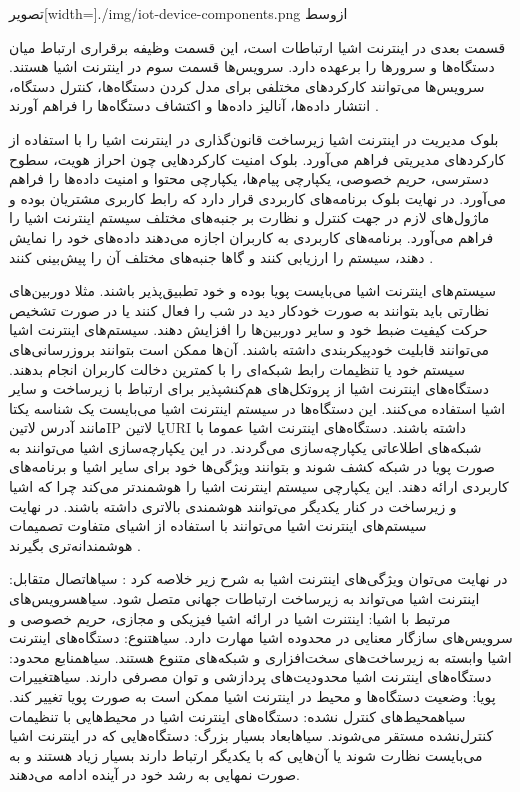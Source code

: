 ‌تصویر[width=\textwidth]{./img/iot-device-components.png}
‌ازوسط

قسمت بعدی در اینترنت اشیا ارتباطات است، این قسمت وظیفه برقراری ارتباط میان دستگاه‌ها و سرورها را برعهده دارد.
سرویس‌ها قسمت سوم در اینترنت اشیا هستند. سرویس‌ها می‌توانند کارکردهای مختلفی برای مدل کردن دستگاه‌ها، کنترل دستگاه،
انتشار داده‌ها، آنالیز داده‌ها و اکتشاف دستگاه‌ها را فراهم آورند
.

بلوک مدیریت در اینترنت اشیا زیرساخت قانون‌گذاری در اینترنت اشیا را با استفاده از کارکردهای مدیریتی فراهم می‌آورد.
بلوک امنیت کارکردهایی چون احراز هویت، سطوح دسترسی، حریم خصوصی، یکپارچی پیام‌ها، یکپارچی محتوا و امنیت داده‌ها را فراهم می‌آورد.
در نهایت بلوک برنامه‌های کاربردی قرار دارد که رابط کاربری مشتریان بوده و ماژول‌های لازم در جهت کنترل و نظارت بر جنبه‌های مختلف سیستم اینترنت اشیا
را فراهم می‌آورد. برنامه‌های کاربردی به کاربران اجازه می‌دهند داده‌های خود را نمایش دهند، سیستم را ارزیابی کنند و گاها جنبه‌های مختلف آن را پیش‌بینی کنند
.

سیستم‌های اینترنت اشیا می‌بایست پویا بوده و خود تطبیق‌پذیر باشند. مثلا دوربین‌های نظارتی باید بتوانند به صورت خودکار دید در شب را فعال کنند یا در صورت تشخیص حرکت
کیفیت ضبط خود و سایر دوربین‌ها را افزایش دهند. سیستم‌های اینترنت اشیا می‌توانند قابلیت خودپیکربندی داشته باشند. آن‌ها ممکن است بتوانند بروزرسانی‌های سیستم خود یا
تنظیمات رابط شبکه‌ای را با کمترین دخالت کاربران انجام بدهند. دستگاه‌های اینترنت اشیا از پروتکل‌های هم‌کنشپذیر برای ارتباط با زیرساخت و سایر اشیا استفاده می‌کنند.
این دستگاه‌ها در سیستم اینترنت اشیا می‌بایست یک شناسه یکتا مانند آدرس ‌لاتین{IP} یا ‌لاتین{URI} داشته باشند. دستگاه‌های اینترنت اشیا عموما با شبکه‌های اطلاعاتی
یکپارچه‌سازی می‌گردند. در این یکپارچه‌سازی اشیا می‌توانند به صورت پویا در شبکه کشف شوند و بتوانند ویژگی‌ها خود برای سایر اشیا و برنامه‌های کاربردی ارائه دهند. این یکپارچی
سیستم اینترنت اشیا را هوشمندتر می‌کند چرا که اشیا و زیرساخت در کنار یکدیگر می‌توانند هوشمندی بالاتری داشته باشند.
در نهایت سیستم‌های اینترنت اشیا می‌توانند با استفاده از اشیای متفاوت تصمیمات هوشمندانه‌تری بگیرند
.

در نهایت می‌توان ویژگی‌های اینترنت اشیا به شرح زیر خلاصه کرد
:
 ‌سیاه{اتصال متقابل}: اینترنت اشیا می‌تواند به زیرساخت ارتباطات جهانی متصل شود.
 ‌سیاه{سرویس‌های مرتبط با اشیا}: اینتنرت اشیا در ارائه اشیا فیزیکی و مجازی، حریم خصوصی و سرویس‌های سازگار معنایی در محدوده اشیا مهارت دارد.
 ‌سیاه{تنوع}: دستگاه‌های اینترنت اشیا وابسته به زیرساخت‌های سخت‌افزاری و شبکه‌های متنوع هستند.
 ‌سیاه{منابع محدود}: دستگاه‌های اینترنت اشیا محدودیت‌های پردازشی و توان مصرفی دارند.
 ‌سیاه{تغییرات پویا}: وضعیت دستگاه‌ها و محیط در اینترنت اشیا ممکن است به صورت پویا تغییر کند.
 ‌سیاه{محیط‌های کنترل نشده}: دستگاه‌های اینترنت اشیا در محیط‌هایی با تنظیمات کنترل‌نشده مستقر می‌شوند.
 ‌سیاه{ابعاد بسیار بزرگ}: دستگاه‌هایی که در اینترنت اشیا می‌بایست نظارت شوند یا آن‌هایی که با یکدیگر ارتباط دارند بسیار زیاد هستند و به صورت نمهایی به رشد خود در آینده ادامه می‌دهند.


